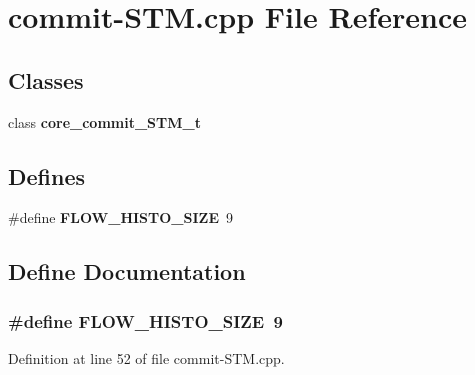 \section{commit-STM.cpp File Reference}
\label{commit-STM_8cpp}
\subsection*{Classes}
\begin{CompactItemize}
\item 
class {\bf core\_\-commit\_\-STM\_\-t}
\end{CompactItemize}
\subsection*{Defines}
\begin{CompactItemize}
\item 
\#define {\bf FLOW\_\-HISTO\_\-SIZE}~9
\end{CompactItemize}


\subsection{Define Documentation}
\subsubsection[{FLOW\_\-HISTO\_\-SIZE}]{\setlength{\rightskip}{0pt plus 5cm}\#define FLOW\_\-HISTO\_\-SIZE~9}\label{commit-STM_8cpp_7e301e88bf620815320ee07e9bda6e62}




Definition at line 52 of file commit-STM.cpp.